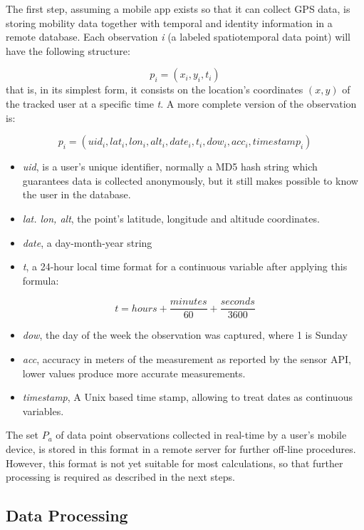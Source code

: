 \documentclass[]{elsarticle} %
\begin{document}
The first step, assuming a mobile app exists so that it can collect GPS
data, is storing mobility data together with temporal and identity
information in a remote database. Each observation \emph{i} (a labeled
spatiotemporal data point) will have the following structure:

\[ p_i = (x_i, y_i, t_i) \] that is, in its simplest form, it consists
on the location's coordinates \((x,y)\) of the tracked user at a
specific time \emph{t}. A more complete version of the observation is:

\[ p_i  = (uid_i, lat_i, lon_i, alt_i, date_i, t_i, dow_i, acc_i, timestamp_i) \]

\begin{itemize}
\item
  \emph{uid}, is a user's unique identifier, normally a MD5 hash string
  which guarantees data is collected anonymously, but it still makes
  possible to know the user in the database.
\item
  \emph{lat. lon, alt}, the point's latitude, longitude and altitude
  coordinates.
\item
  \emph{date}, a day-month-year string
\item
  \emph{t}, a 24-hour local time format for a continuous variable after
  applying this formula:
\end{itemize}

\[ t  =  hours + \frac{minutes}{60} + \frac{seconds}{3600}\]

\begin{itemize}
\item
  \emph{dow}, the day of the week the observation was captured, where 1
  is Sunday
\item
  \emph{acc}, accuracy in meters of the measurement as reported by the
  sensor API, lower values produce more accurate measurements.
\item
  \emph{timestamp}, A Unix based time stamp, allowing to treat dates as
  continuous variables.
\end{itemize}

The set \(P_a\) of data point observations collected in real-time by a
user's mobile device, is stored in this format in a remote server for
further off-line procedures. However, this format is not yet suitable
for most calculations, so that further processing is required as
described in the next steps.

\hypertarget{data-processing}{%
\subsection{Data Processing}\label{data-processing}}
\end{document}
